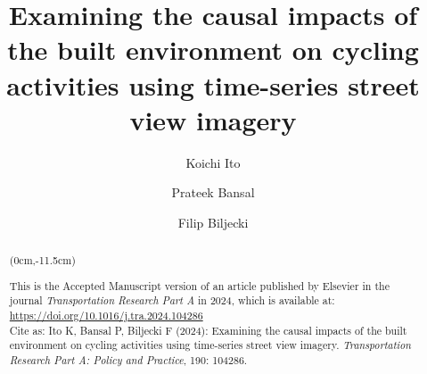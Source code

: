 \documentclass[preprint,12pt, authoryear]{elsarticle}
\begin{document}
\begin{frontmatter}

\title{Examining the causal impacts of the built environment on cycling activities using time-series street view imagery}

\author[doa]{Koichi Ito}
\author[dcee]{Prateek Bansal}
\author[doa,dre]{Filip Biljecki}





\begin{abstract}
\begin{textblock*}{\textwidth}(0cm,-11.5cm)
\begin{center}
\begin{footnotesize}
\begin{boxedminipage}{1\textwidth}
This is the Accepted Manuscript version of an article published by Elsevier in the journal \emph{Transportation Research Part A} in 2024, which is available at:\\ \url{https://doi.org/10.1016/j.tra.2024.104286}\\ Cite as:
Ito K, Bansal P, Biljecki F (2024): Examining the causal impacts of the built environment on cycling activities using time-series street view imagery. \textit{Transportation Research Part A: Policy and Practice}, 190: 104286.
\end{boxedminipage}
\end{footnotesize}
\end{center}
\end{textblock*}


\end{abstract}
\end{frontmatter}
\end{document}
